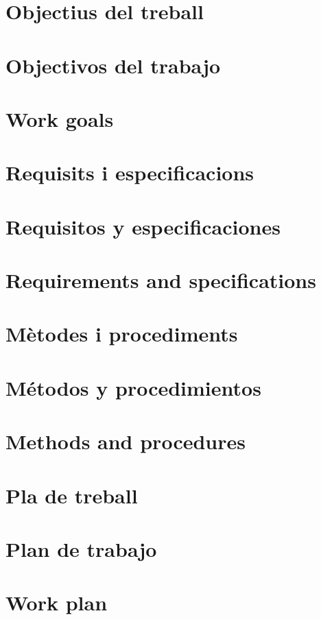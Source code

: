 \ifcase\doclanguage
\or
  \section{Objectius del treball}
\or
  \section{Objectivos del trabajo}
\else
  \section{Work goals}
\fi

\lipsum[1]

\ifcase\doclanguage
\or
  \section{Requisits i especificacions}
\or
  \section{Requisitos y especificaciones}
\else
  \section{Requirements and specifications}
\fi

\lipsum[2-4]

\ifcase\doclanguage
\or
  \section{Mètodes i procediments}
\or
  \section{Métodos y procedimientos}
\else
  \section{Methods and procedures}
\fi

\lipsum[5-6]

\ifcase\doclanguage
\or
  \section{Pla de treball}
\or
  \section{Plan de trabajo}
\else
  \section{Work plan}
\fi
\label{sec:workplan}

